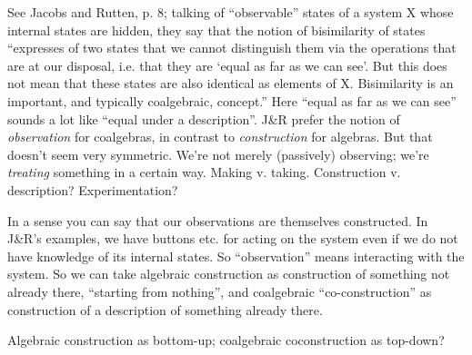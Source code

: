 \begin{ednote}
  See Jacobs and Rutten, p. 8; talking of ``observable'' states of a
  system X whose internal states are hidden, they say that the notion
  of bisimilarity of states ``expresses of two states that we cannot
  distinguish them via the operations that are at our disposal,
  i.e. that they are `equal as far as we can see'.  But this does not
  mean that these states are also identical as elements of X.
  Bisimilarity is an important, and typically coalgebraic, concept.''
  Here ``equal as far as we can see'' sounds a lot like ``equal under
  a description''.  J\&R prefer the notion of \emph{observation} for
  coalgebras, in contrast to \emph{construction} for algebras.  But
  that doesn't seem very symmetric.  We're not merely (passively)
  observing; we're \emph{treating} something in a certain way.  Making
  v. taking.  Construction v. description?  Experimentation?

  In a sense you can say that our observations are themselves
  constructed.  In J\&R's examples, we have buttons etc. for acting on
  the system even if we do not have knowledge of its internal states.
  So ``observation'' means interacting with the system.  So we can
  take algebraic construction as construction of something not already
  there, ``starting from nothing'', and coalgebraic
  ``co-construction'' as construction of a description of something
  already there.

  Algebraic construction as bottom-up; coalgebraic coconstruction as
  top-down?
\end{ednote}
